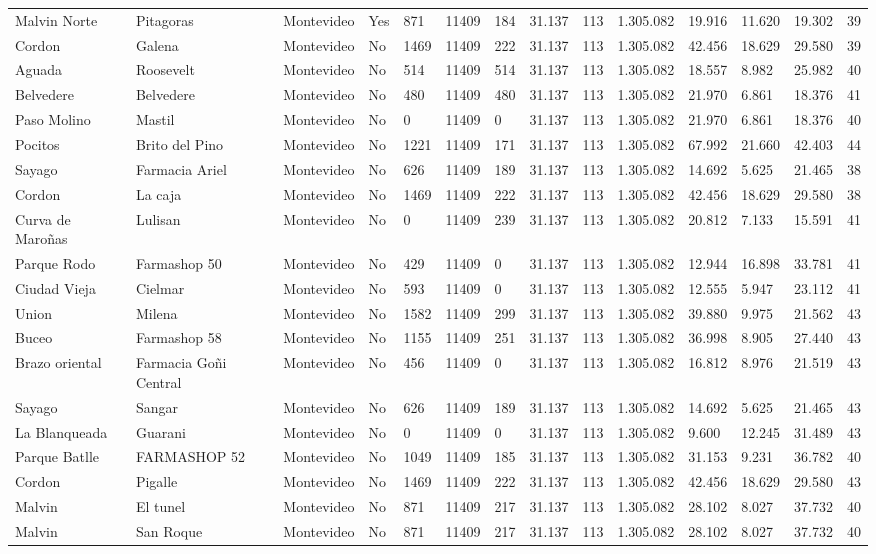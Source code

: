 \documentclass[11pt]{article}
\begin{document}
\begin{landscape}
\begin{longtable}[htbp]{@{}p{1.2cm}p{1cm}p{1.5cm}p{1cm}p{1cm}p{1cm}p{1cm}p{1cm}p{1cm}p{1cm}p{1cm}p{1.2cm}p{1cm}p{1cm}@{}}
Malvin Norte	&	Pitagoras	&	Montevideo	&	Yes	&	871	&	11409	&	184	&	31.137	&	113	&	1.305.082	&	19.916	&	11.620	&	19.302	&	39	\tabularnewline
Cordon	&	Galena	&	Montevideo	&	No	&	1469	&	11409	&	222	&	31.137	&	113	&	1.305.082	&	42.456	&	18.629	&	29.580	&	39	\tabularnewline
Aguada	&	Roosevelt	&	Montevideo	&	No	&	514	&	11409	&	514	&	31.137	&	113	&	1.305.082	&	18.557	&	8.982	&	25.982	&	40	\tabularnewline
Belvedere	&	Belvedere	&	Montevideo	&	No	&	480	&	11409	&	480	&	31.137	&	113	&	1.305.082	&	21.970	&	6.861	&	18.376	&	41	\tabularnewline
Paso Molino	&	Mastil	&	Montevideo	&	No	&	0	&	11409	&	0	&	31.137	&	113	&	1.305.082	&	21.970	&	6.861	&	18.376	&	40	\tabularnewline
Pocitos	&	Brito del Pino	&	Montevideo	&	No	&	1221	&	11409	&	171	&	31.137	&	113	&	1.305.082	&	67.992	&	21.660	&	42.403	&	44	\tabularnewline
Sayago	&	Farmacia Ariel	&	Montevideo	&	No	&	626	&	11409	&	189	&	31.137	&	113	&	1.305.082	&	14.692	&	5.625	&	21.465	&	38	\tabularnewline
Cordon	&	La caja	&	Montevideo	&	No	&	1469	&	11409	&	222	&	31.137	&	113	&	1.305.082	&	42.456	&	18.629	&	29.580	&	38	\tabularnewline
Curva de Maroñas	&	Lulisan	&	Montevideo	&	No	&	0	&	11409	&	239	&	31.137	&	113	&	1.305.082	&	20.812	&	7.133	&	15.591	&	41	\tabularnewline
Parque Rodo	&	Farmashop 50	&	Montevideo	&	No	&	429	&	11409	&	0	&	31.137	&	113	&	1.305.082	&	12.944	&	16.898	&	33.781	&	41	\tabularnewline
Ciudad Vieja	&	Cielmar	&	Montevideo	&	No	&	593	&	11409	&	0	&	31.137	&	113	&	1.305.082	&	12.555	&	5.947	&	23.112	&	41	\tabularnewline
Union	&	Milena	&	Montevideo	&	No	&	1582	&	11409	&	299	&	31.137	&	113	&	1.305.082	&	39.880	&	9.975	&	21.562	&	43	\tabularnewline
Buceo	&	Farmashop 58	&	Montevideo	&	No	&	1155	&	11409	&	251	&	31.137	&	113	&	1.305.082	&	36.998	&	8.905	&	27.440	&	43	\tabularnewline
Brazo oriental	&	Farmacia Goñi Central	&	Montevideo	&	No	&	456	&	11409	&	0	&	31.137	&	113	&	1.305.082	&	16.812	&	8.976	&	21.519	&	43	\tabularnewline
Sayago	&	Sangar	&	Montevideo	&	No	&	626	&	11409	&	189	&	31.137	&	113	&	1.305.082	&	14.692	&	5.625	&	21.465	&	43	\tabularnewline
La Blanqueada	&	Guarani	&	Montevideo	&	No	&	0	&	11409	&	0	&	31.137	&	113	&	1.305.082	&	9.600	&	12.245	&	31.489	&	43	\tabularnewline
Parque Batlle	&	FARMASHOP 52	&	Montevideo	&	No	&	1049	&	11409	&	185	&	31.137	&	113	&	1.305.082	&	31.153	&	9.231	&	36.782	&	40	\tabularnewline
Cordon	&	Pigalle	&	Montevideo	&	No	&	1469	&	11409	&	222	&	31.137	&	113	&	1.305.082	&	42.456	&	18.629	&	29.580	&	43	\tabularnewline
Malvin	&	El tunel	&	Montevideo	&	No	&	871	&	11409	&	217	&	31.137	&	113	&	1.305.082	&	28.102	&	8.027	&	37.732	&	40	\tabularnewline
Malvin	&	San Roque	&	Montevideo	&	No	&	871	&	11409	&	217	&	31.137	&	113	&	1.305.082	&	28.102	&	8.027	&	37.732	&	40	\tabularnewline

\end{longtable}
\end{landscape}
\end{document}

